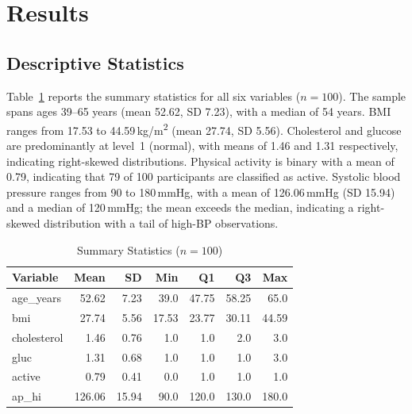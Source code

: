 ﻿\documentclass[conference]{IEEEtran}
\begin{document}
\section{Results}
\label{sec:results}

\subsection{Descriptive Statistics}

Table~\ref{tab:summary} reports the summary statistics for all six variables ($n=100$). The sample spans ages 39--65 years (mean 52.62, SD 7.23), with a median of 54 years. BMI ranges from 17.53 to 44.59\,kg/m\textsuperscript{2} (mean 27.74, SD 5.56). Cholesterol and glucose are predominantly at level~1 (normal), with means of 1.46 and 1.31 respectively, indicating right-skewed distributions. Physical activity is binary with a mean of 0.79, indicating that 79 of 100 participants are classified as active. Systolic blood pressure ranges from 90 to 180\,mmHg, with a mean of 126.06\,mmHg (SD 15.94) and a median of 120\,mmHg; the mean exceeds the median, indicating a right-skewed distribution with a tail of high-BP observations.

\begin{table}[t]
  \centering
  \caption{Summary Statistics ($n = 100$)}
  \label{tab:summary}
  \renewcommand{\arraystretch}{1.15}
  \begin{tabular}{lrrrrrr}
    \toprule
    \textbf{Variable} & \textbf{Mean} & \textbf{SD} & \textbf{Min} & \textbf{Q1} & \textbf{Q3} & \textbf{Max} \\
    \midrule
    age\_years  & 52.62 & 7.23  & 39.0  & 47.75 & 58.25 & 65.0  \\
    bmi         & 27.74 & 5.56  & 17.53 & 23.77 & 30.11 & 44.59 \\
    cholesterol &  1.46 & 0.76  &  1.0  &  1.0  &  2.0  &  3.0  \\
    gluc        &  1.31 & 0.68  &  1.0  &  1.0  &  1.0  &  3.0  \\
    active      &  0.79 & 0.41  &  0.0  &  1.0  &  1.0  &  1.0  \\
    ap\_hi      & 126.06 & 15.94 & 90.0 & 120.0 & 130.0 & 180.0 \\
    \bottomrule
  \end{tabular}
\end{table}
\end{document}
